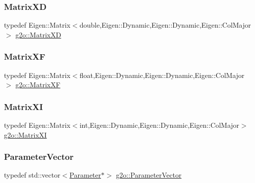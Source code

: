 \subsubsection{\texorpdfstring{Matrix\+XD}{MatrixXD}}
{\footnotesize\ttfamily typedef Eigen\+::\+Matrix$<$double,Eigen\+::\+Dynamic,Eigen\+::\+Dynamic,Eigen\+::\+Col\+Major$>$ \mbox{\hyperlink{namespaceg2o_a8a808fe01b0b4e0afe637fe680853d0a}{g2o\+::\+Matrix\+XD}}}

\mbox{\label{namespaceg2o_a9cf1a3355d8ef3a852aa23866754758c}} 
\subsubsection{\texorpdfstring{Matrix\+XF}{MatrixXF}}
{\footnotesize\ttfamily typedef Eigen\+::\+Matrix$<$float,Eigen\+::\+Dynamic,Eigen\+::\+Dynamic,Eigen\+::\+Col\+Major$>$ \mbox{\hyperlink{namespaceg2o_a9cf1a3355d8ef3a852aa23866754758c}{g2o\+::\+Matrix\+XF}}}

\mbox{\label{namespaceg2o_a43b1af9ed52619c66479d4820a126aef}} 
\subsubsection{\texorpdfstring{Matrix\+XI}{MatrixXI}}
{\footnotesize\ttfamily typedef Eigen\+::\+Matrix$<$int,Eigen\+::\+Dynamic,Eigen\+::\+Dynamic,Eigen\+::\+Col\+Major$>$ \mbox{\hyperlink{namespaceg2o_a43b1af9ed52619c66479d4820a126aef}{g2o\+::\+Matrix\+XI}}}

\mbox{\label{namespaceg2o_a85cc8f2c7db8cab47b2b269a7acd6785}} 
\subsubsection{\texorpdfstring{Parameter\+Vector}{ParameterVector}}
{\footnotesize\ttfamily typedef std\+::vector$<$\mbox{\hyperlink{classg2o_1_1_parameter}{Parameter}}$\ast$$>$ \mbox{\hyperlink{namespaceg2o_a85cc8f2c7db8cab47b2b269a7acd6785}{g2o\+::\+Parameter\+Vector}}}

\mbox{\label{namespaceg2o_a0802a5e01a6b1861ae01013220dec6ac}} 

